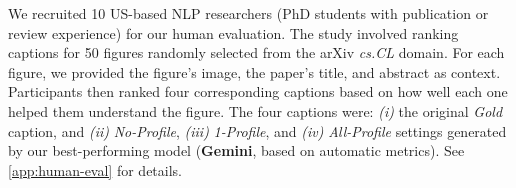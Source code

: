 
% 


%




We recruited 10 US-based NLP researchers (PhD students with publication or review experience) for our human evaluation.
The study involved ranking captions for 50 figures randomly selected from the arXiv \textit{cs.CL} domain. 
For each figure, we provided the figure's image, the paper's title, and abstract as context. 
Participants then ranked four corresponding captions based on how well each one helped them understand the figure. The four captions were:
{\em (i)} the original \textit{Gold} caption, and
{\em (ii)} \textit{No-Profile}, 
{\em (iii)} \textit{1-Profile}, and 
{\em (iv)} \textit{All-Profile} settings generated by our best-performing model (\textbf{Gemini}, based on automatic metrics). 
See \autoref{app:human-eval} for details.

